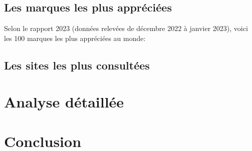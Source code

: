 \documentclass[12pt, a4paper]{report}
\begin{document}

\section{Les marques les plus appréciées}

Selon le rapport 2023 (données relevées de décembre 2022 à janvier 2023), voici les 100 marques les plus appréciées au monde:



\section{Les sites les plus consultées}



\chapter{Analyse détaillée}




\newpage
\chapter{Conclusion}

\end{document}
